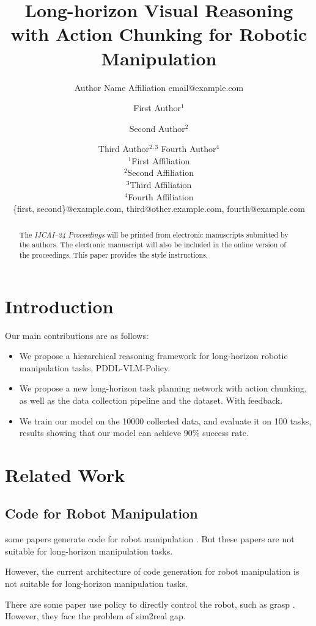 \documentclass{article}
\title{Long-horizon Visual Reasoning with Action Chunking for Robotic Manipulation}
\author{
    Author Name
    \affiliations
    Affiliation
    \emails
    email@example.com
}
\author{
First Author$^1$
\and
Second Author$^2$\and
Third Author$^{2,3}$\And
Fourth Author$^4$\\
\affiliations
$^1$First Affiliation\\
$^2$Second Affiliation\\
$^3$Third Affiliation\\
$^4$Fourth Affiliation\\
\emails
\{first, second\}@example.com,
third@other.example.com,
fourth@example.com
}
\begin{document}
\maketitle

\begin{abstract}
    The {\it IJCAI--24 Proceedings} will be printed from electronic
    manuscripts submitted by the authors. The electronic manuscript will
    also be included in the online version of the proceedings. This paper
    provides the style instructions.
\end{abstract}

\section{Introduction}




Our main contributions are as follows:
\begin{itemize}
    \item We propose a hierarchical reasoning framework for long-horizon robotic manipulation tasks, PDDL-VLM-Policy. 
    \item We propose a new long-horizon task planning network with action chunking, as well as the data collection pipeline and the dataset. With feedback.
    \item We train our model on the 10000 collected data, and evaluate it on 100 tasks, results showing that our model can achieve 90\% success rate.
\end{itemize}

\section{Related Work}

\subsection{Code for Robot Manipulation}

some papers generate code for robot manipulation \cite{mu2024robocodex}. But these papers are not suitable for long-horizon manipulation tasks.

However, the current architecture of code generation for robot manipulation is not suitable for long-horizon manipulation tasks.

There are some paper use policy to directly control the robot, such as grasp \cite{wang2023dexgraspnet}. However, they face the problem of sim2real gap.
\end{document}
